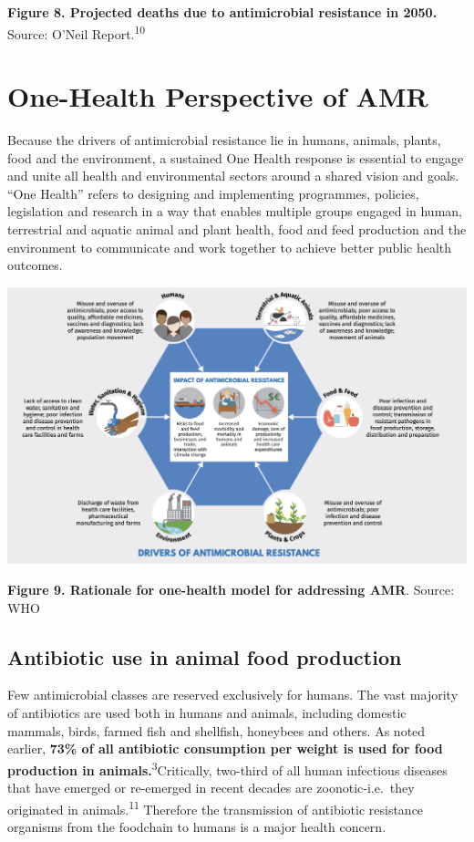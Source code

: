 \documentclass[
]{book}
\begin{document}
\textbf{Figure 8. Projected deaths due to antimicrobial resistance in 2050.} Source: O'Neil Report.\textsuperscript{10}

\hypertarget{one-health-perspective-of-amr}{%
\section*{One-Health Perspective of AMR}\label{one-health-perspective-of-amr}}

Because the drivers of antimicrobial resistance lie in humans, animals, plants, food and the environment, a sustained One Health response is essential to engage and unite all health and environmental sectors around a shared vision and goals. ``One Health'' refers to designing and implementing programmes, policies, legislation and research in a way that enables multiple groups engaged in human, terrestrial and aquatic animal and plant health, food and feed production and the environment to communicate and work together to achieve better public health outcomes.

\includegraphics[width=8.33333in,height=\textheight]{images/onehealth.jpg}

\textbf{Figure 9. Rationale for one-health model for addressing AMR}. Source: WHO

\hypertarget{antibiotic-use-in-animal-food-production}{%
\subsection*{Antibiotic use in animal food production}\label{antibiotic-use-in-animal-food-production}}

Few antimicrobial classes are reserved exclusively for humans. The vast majority of antibiotics are used both in humans and animals, including domestic mammals, birds, farmed fish and shellfish, honeybees and others. As noted earlier, \textbf{73\% of all antibiotic consumption per weight is used for food production in animals.}\textsuperscript{3}Critically, two-third of all human infectious diseases that have emerged or re-emerged in recent decades are zoonotic-i.e.~they originated in animals.\textsuperscript{11} Therefore the transmission of antibiotic resistance organisms from the foodchain to humans is a major health concern.
\end{document}
